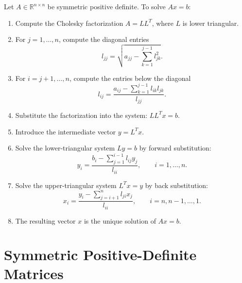 \documentclass[11pt]{article}
\begin{document}
Let $A\in\mathbb{R}^{n\times n}$ be symmetric positive definite.  To solve $Ax=b$:
\begin{enumerate}
  \item Compute the Cholesky factorization $A=LL^T$, where $L$ is lower triangular.
  \item For $j=1,\ldots,n$, compute the diagonal entries
  \[
  l_{jj}=\sqrt{a_{jj}-\sum_{k=1}^{j-1}l_{jk}^2}.
  \]
  \item For $i=j+1,\ldots,n$, compute the entries below the diagonal
  \[
  l_{ij}=\frac{a_{ij}-\sum_{k=1}^{j-1}l_{ik}l_{jk}}{l_{jj}}.
  \]
  \item Substitute the factorization into the system: $LL^Tx=b$.
  \item Introduce the intermediate vector $y=L^Tx$.
  \item Solve the lower-triangular system $Ly=b$ by forward substitution:
  \[
  y_i=\frac{b_i-\sum_{j=1}^{i-1}l_{ij}y_j}{l_{ii}},
  \qquad i=1,\ldots,n.
  \]
  \item Solve the upper-triangular system $L^Tx=y$ by back substitution:
  \[
  x_i=\frac{y_i-\sum_{j=i+1}^{n}l_{ji}x_j}{l_{ii}},
  \qquad i=n,n-1,\ldots,1.
  \]
  \item The resulting vector $x$ is the unique solution of $Ax=b$.
\end{enumerate}

\section{Symmetric Positive-Definite Matrices}
\end{document}
